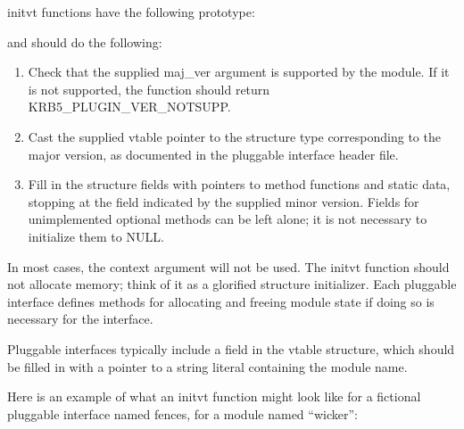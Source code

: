 \documentclass[letterpaper,10pt,english]{sphinxmanual}
\begin{document}
initvt functions have the following prototype:

%
\begin{sphinxVerbatim}[commandchars=\\\{\}]
  
                                            
                                          
\end{sphinxVerbatim}

and should do the following:
\begin{enumerate}
\item {} 
Check that the supplied maj\_ver argument is supported by the
module.  If it is not supported, the function should return
KRB5\_PLUGIN\_VER\_NOTSUPP.

\item {} 
Cast the supplied vtable pointer to the structure type
corresponding to the major version, as documented in the pluggable
interface header file.

\item {} 
Fill in the structure fields with pointers to method functions and
static data, stopping at the field indicated by the supplied minor
version.  Fields for unimplemented optional methods can be left
alone; it is not necessary to initialize them to NULL.

\end{enumerate}

In most cases, the context argument will not be used.  The initvt
function should not allocate memory; think of it as a glorified
structure initializer.  Each pluggable interface defines methods for
allocating and freeing module state if doing so is necessary for the
interface.

Pluggable interfaces typically include a  field in the vtable
structure, which should be filled in with a pointer to a string
literal containing the module name.

Here is an example of what an initvt function might look like for a
fictional pluggable interface named fences, for a module named
“wicker”:
\end{document}
